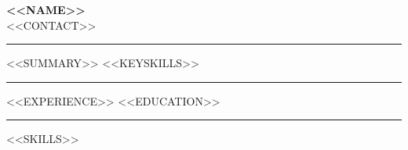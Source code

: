 \documentclass[11pt,a4paper]{article}
\newcommand{\heading}[1]{\par\vspace{7pt}{\large\bfseries #1}\vspace{1pt}\hrule\vspace{5pt}}
\begin{document}
{\Huge\bfseries <<NAME>>}\\[3pt]
<<CONTACT>>
\heading{Summary}
<<SUMMARY>>
<<KEYSKILLS>>
\heading{Experience}
<<EXPERIENCE>>
<<EDUCATION>>
\heading{Skills}
<<SKILLS>>
\end{document}
